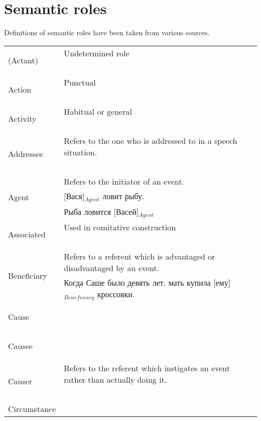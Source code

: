 \documentclass[a4paper,11pt, onecolumn,twoside]{article}
\begin{document}
\section{Semantic roles}
\label{sec:semroles}

Definitions of semantic roles have been taken from various sources.

\begin{longtable}{ p{}  p{} } 
\toprule
 \multirow{2}{*}{(Actant)} & Undetermined role \\ 
        & ~ \\
\midrule
 \multirow{2}{*}{Action} & Punctual  \\ 
        & ~ \\
\midrule
 \multirow{2}{*}{Activity} & Habitual or general \\ 
        & ~ \\
\midrule
 \multirow{2}{*}{Addressee} & Refers to the one who is addressed to in a speech situation. \\ 
        & ~ \\
\midrule
 \multirow{3}{*}{Agent} & Refers to the initiator of an event. \\ 
        & [Вася]$_{Agent}$ ловит рыбу. \\
        & Рыба ловится [Васей]$_{Agent}$ \\
\midrule
 \multirow{2}{*}{Associated} & Used in comitative construction \\ 
        & ~ \\
\midrule
 \multirow{2}{*}{Beneficiary} & Refers to a referent which is advantaged or disadvantaged by an event. \\ 
        & Когда Саше было девять лет, мать купила [ему]$_{Beneficiary}$ кроссовки. \\
\midrule
 \multirow{2}{*}{Cause} & ~ \\ 
        & ~ \\
\midrule
 \multirow{2}{*}{Causee} & ~ \\ 
        & ~ \\
\midrule
 \multirow{2}{*}{Causer} & Refers to the referent which instigates an event rather than actually doing it. \\ 
        & ~ \\
\midrule
 \multirow{2}{*}{Circumstance} & ~ \\ 

\end{longtable}
\end{document}
